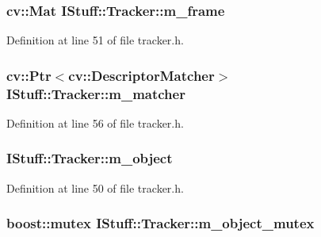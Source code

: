 \hypertarget{class_i_stuff_1_1_tracker_a174749550b4b79c8ddf91e9a744fb50d}{
\subsubsection[{m\-\_\-frame}]{\setlength{\rightskip}{0pt plus 5cm}cv\-::\-Mat I\-Stuff\-::\-Tracker\-::m\-\_\-frame\hspace{0.3cm}{\ttfamily [private]}}}\label{class_i_stuff_1_1_tracker_a174749550b4b79c8ddf91e9a744fb50d}


Definition at line 51 of file tracker.\-h.

\hypertarget{class_i_stuff_1_1_tracker_a126a9bea1a885a25b3fc734c96a052de}{
\subsubsection[{m\-\_\-matcher}]{\setlength{\rightskip}{0pt plus 5cm}cv\-::\-Ptr$<$cv\-::\-Descriptor\-Matcher$>$ I\-Stuff\-::\-Tracker\-::m\-\_\-matcher\hspace{0.3cm}{\ttfamily [private]}}}\label{class_i_stuff_1_1_tracker_a126a9bea1a885a25b3fc734c96a052de}


Definition at line 56 of file tracker.\-h.

\hypertarget{class_i_stuff_1_1_tracker_a1d7215169ee7adb0bb9f182c0aaaa311}{
\subsubsection[{m\-\_\-object}]{ I\-Stuff\-::\-Tracker\-::m\-\_\-object\hspace{0.3cm}{\ttfamily [private]}}}\label{class_i_stuff_1_1_tracker_a1d7215169ee7adb0bb9f182c0aaaa311}


Definition at line 50 of file tracker.\-h.

\hypertarget{class_i_stuff_1_1_tracker_a71c26a9c9d53b53cd3e6f46bfb9e1af1}{
\subsubsection[{m\-\_\-object\-\_\-mutex}]{\setlength{\rightskip}{0pt plus 5cm}boost\-::mutex I\-Stuff\-::\-Tracker\-::m\-\_\-object\-\_\-mutex\hspace{0.3cm}{\ttfamily [private]}}}\label{class_i_stuff_1_1_tracker_a71c26a9c9d53b53cd3e6f46bfb9e1af1}


